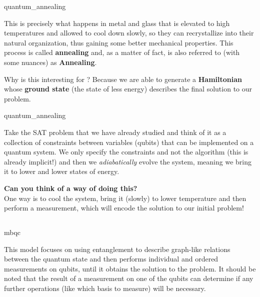\documentclass[aspectratio=43]{beamer}
\begin{document}
\begin{frameImg}[height]{quantum_annealing}
    \begin{card}
        This is precisely what happens in metal and glass that is elevated to high temperatures and allowed to cool down slowly, so they can recrystallize into their natural organization, thus gaining some better mechanical properties. This process is called \textbf{annealing} and, as a matter of fact, \aqc is also referred to (with some nuances) as \textbf{\q Annealing}.
    \end{card}
    \begin{card}
        Why is this interesting for \qc? Because we are able to generate a \textbf{Hamiltonian} whose \textbf{ground state} (the state of less energy) describes the final solution to our problem.
    \end{card}
\pagenumber
\end{frameImg}

\begin{frameImg}[height]{quantum_annealing}
    \begin{card}
        Take the SAT problem that we have already studied and think of it as a collection of constraints between variables (qubits) that can be implemented on a quantum system. We only specify the constraints and not the algorithm (this is already implicit!) and then we \textit{adiabatically} evolve the system, meaning we bring it to lower and lower states of energy.
    \end{card}
    \begin{card}
        \textbf{Can you think of a way of doing this?}\\
        One way is to cool the system, bring it (slowly) to lower temperature and then perform a measurement, which will encode the solution to our initial problem!
    \end{card}
\pagenumber
\end{frameImg}



\subsection{\mbqc}
\begin{frameImg}[height]{mbqc}
    \begin{card}
        This model focuses on using entanglement to describe graph-like relations between the quantum state and then performs individual and ordered measurements on qubits, until it obtains the solution to the problem. It should be noted that the result of a measurement on one of the qubits can determine if any further operations (like which basis to measure) will be necessary.
    \end{card}
\pagenumber
\end{frameImg}
\end{document}
